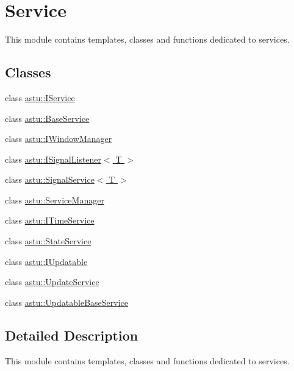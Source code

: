 \hypertarget{group__srv__group}{}\section{Service}
\label{group__srv__group}


This module contains templates, classes and functions dedicated to services.  


\subsection*{Classes}
\begin{DoxyCompactItemize}
\item 
class \hyperlink{classastu_1_1IService}{astu\+::\+I\+Service}
\item 
class \hyperlink{classastu_1_1BaseService}{astu\+::\+Base\+Service}
\item 
class \hyperlink{classastu_1_1IWindowManager}{astu\+::\+I\+Window\+Manager}
\item 
class \hyperlink{classastu_1_1ISignalListener}{astu\+::\+I\+Signal\+Listener$<$ T $>$}
\item 
class \hyperlink{classastu_1_1SignalService}{astu\+::\+Signal\+Service$<$ T $>$}
\item 
class \hyperlink{classastu_1_1ServiceManager}{astu\+::\+Service\+Manager}
\item 
class \hyperlink{classastu_1_1ITimeService}{astu\+::\+I\+Time\+Service}
\item 
class \hyperlink{classastu_1_1StateService}{astu\+::\+State\+Service}
\item 
class \hyperlink{classastu_1_1IUpdatable}{astu\+::\+I\+Updatable}
\item 
class \hyperlink{classastu_1_1UpdateService}{astu\+::\+Update\+Service}
\item 
class \hyperlink{classastu_1_1UpdatableBaseService}{astu\+::\+Updatable\+Base\+Service}
\end{DoxyCompactItemize}


\subsection{Detailed Description}
This module contains templates, classes and functions dedicated to services. 

